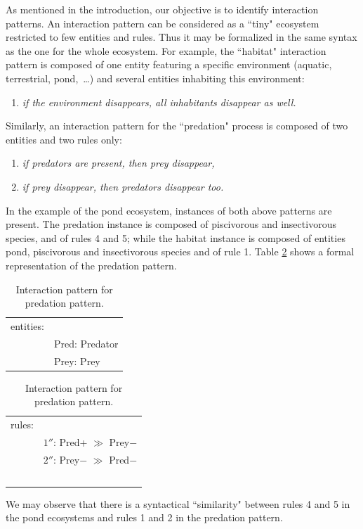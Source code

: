 \documentclass[a4paper,twoside]{article}
\begin{document}
As mentioned in the introduction, our objective is to identify interaction patterns.
An interaction pattern can be considered as a ``tiny" ecosystem restricted to few entities and rules. 
Thus it may be formalized in the same syntax as the one for the whole ecosystem. 
For example, the ``habitat" interaction pattern is composed of one entity featuring a specific environment (aquatic, terrestrial, pond,~\dots) and several entities inhabiting this environment: 
\begin{enumerate}
\item %
\emph{if the environment disappears, all inhabitants disappear as well.}
\end{enumerate} 
%
Similarly, 
an interaction pattern for the ``predation" process is composed of two entities and two rules only:  
%
\begin{enumerate}
\item %
\emph{if predators are present, then prey disappear,}
\item %
\emph{if prey disappear, then predators disappear too.}
\end{enumerate} 

In the example of the pond ecosystem, instances of both above patterns are present. The predation instance is composed of piscivorous and insectivorous species, and of rules 4 and 5; 
while the habitat instance is composed of entities pond, piscivorous and insectivorous species and of rule 1. 
Table \ref{tab:patt} shows a formal representation of the predation pattern.
%
\begin{table}
\centering
\begin{tabular}{ll}
entities:&\\
    &Pred: Predator \\
    &Prey: Prey \\
\end{tabular} \qquad 
\begin{tabular}{ll}    
rules:&\\
    &$1''$: Pred+  $\gg$ Prey$-$ \\
    &$2''$: Prey$-$  $\gg$ Pred$-$ \\~
\end{tabular}
\caption{Interaction pattern for predation pattern.}\label{tab:patt}
\end{table}
%
We may observe that there is a syntactical ``similarity" between rules 4 and 5 in the pond ecosystems and rules 1 and 2 in the predation pattern.
\end{document}
